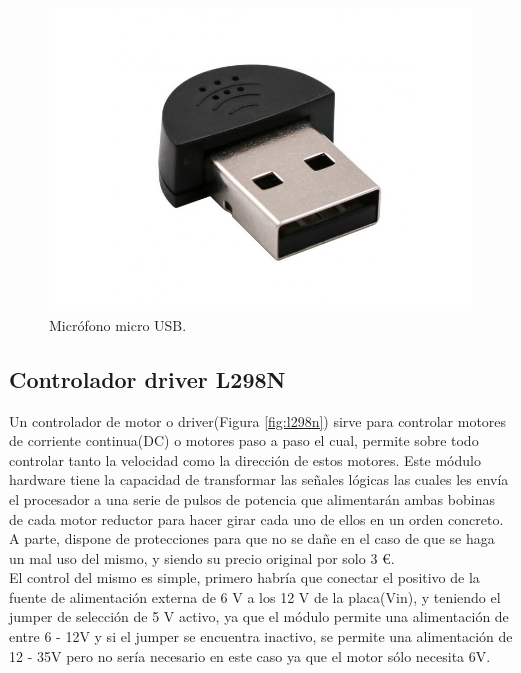\begin{figure}[H] %
  \begin{center}
    \includegraphics[scale=0.3]{figs/microfono-usb}
  \end{center}
  \caption{Micrófono micro USB.}
  \label{fig:microfono-usb}
\end{figure}


\subsection{Controlador driver L298N}
\label{subsec:l298n}

Un controlador de motor o driver(Figura \ref{fig:l298n}) sirve para controlar motores de corriente continua(DC) o motores paso a paso el cual, permite sobre todo controlar tanto la velocidad como la dirección de estos motores. Este módulo hardware tiene la capacidad de transformar las señales lógicas las cuales les envía el procesador a una serie de pulsos de potencia que alimentarán ambas bobinas de cada motor reductor para hacer girar cada uno de ellos en un orden concreto. A parte, dispone de protecciones para que no se dañe en el caso de que se haga un mal uso del mismo, y siendo su precio original por solo 3 \euro.\\ 

El control del mismo es simple, primero habría que conectar el positivo de la fuente de alimentación externa de 6 V a los 12 V de la placa(Vin), y teniendo el jumper de selección de 5 V activo, ya que el módulo permite una alimentación de entre 6 - 12V y si el jumper se encuentra inactivo, se permite una alimentación de 12 - 35V pero no sería necesario en este caso ya que el motor sólo necesita 6V. \\

